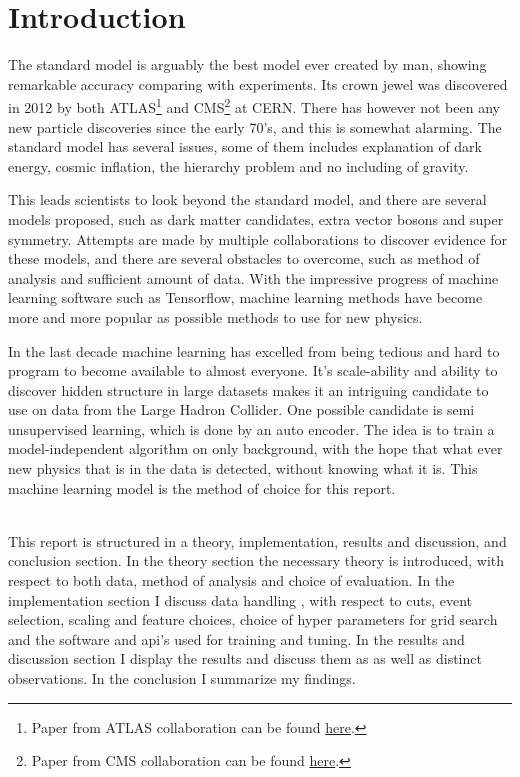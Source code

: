 \documentclass[ reprint, amsmath,amssymb, aps, nofootinbib]{revtex4-2}
\begin{document}
\section{Introduction}
The standard model is arguably the best model ever created by man, showing remarkable accuracy comparing with experiments. Its crown jewel was discovered in 2012 by both ATLAS\footnote{Paper from ATLAS collaboration can be found \href{https://arxiv.org/abs/1207.7214}{here}.} and CMS\footnote{Paper from CMS collaboration can be found \href{https://arxiv.org/abs/1207.7235}{here}.} at CERN. There has however not been any new particle discoveries since the early 70's, and this is somewhat alarming. The standard model has several issues, some of them includes explanation of dark energy, cosmic inflation, the hierarchy problem and no including of gravity. \par 
This leads scientists to look beyond the standard model, and there are several models proposed, such as dark matter candidates, extra vector bosons and super symmetry. Attempts are made by multiple collaborations to discover evidence for these models, and there are several obstacles to overcome, such as method of analysis and sufficient amount of data. With the impressive progress of machine learning software such as Tensorflow\cite{tensorflow2015-whitepaper}, machine learning methods have become more and more popular as possible methods  to use for new physics. \par 
In the last decade machine learning has excelled from being tedious and hard to program to become available to almost everyone. It's scale-ability and ability to discover hidden structure in large datasets makes it an intriguing candidate to use on data from the Large Hadron Collider. One possible candidate is semi unsupervised learning, which is done by an auto encoder. The idea is to train a model-independent algorithm on only background, with the hope that what ever new physics that is in the data is detected, without knowing what it is.  This machine learning model is the method of choice for this report. \par
\\
This report is structured in a theory, implementation, results and discussion, and conclusion section. In the theory section the necessary theory is introduced, with respect to both data, method of analysis and choice of evaluation. In the implementation section I discuss data handling , with respect to cuts, event selection, scaling and feature choices, choice of hyper parameters for grid search and the software and api's used for training and tuning. In the results and discussion section I display the results and discuss them as as well as distinct observations. In the conclusion I summarize my findings. 
\end{document}
